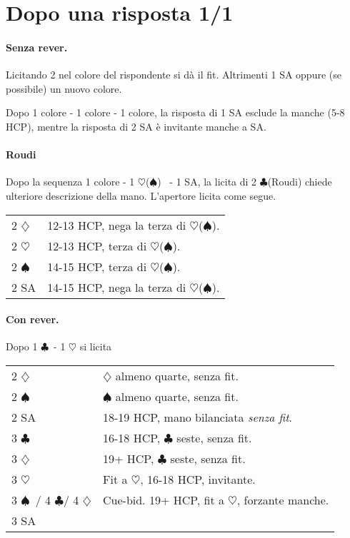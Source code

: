 \documentclass[a4paper,10pt]{article}
\renewcommand{\c}{$\clubsuit$\xspace}
\renewcommand{\d}{$\diamondsuit$\xspace}
\newcommand{\h}{$\heartsuit$\xspace}
\newcommand{\s}{$\spadesuit$\xspace}
\newcommand{\sa}{SA\xspace}
\newcommand{\smallspace}{\vskip0.3cm}
\newenvironment{twocol}
  {\smallspace\noindent\begin{tabular}{l p{0.78\textwidth}}}
  {\end{tabular}\smallspace}
\begin{document}
\pagebreak


\section{Dopo una risposta 1/1}

\paragraph{Senza rever.} Licitando 2 nel colore del rispondente si dà il fit. Altrimenti 1 \sa oppure (se possibile) un nuovo colore.

Dopo 1 colore - 1 colore - 1 colore, la risposta di 1 \sa esclude la manche (5-8 HCP), mentre la risposta di 2 \sa è invitante manche a \sa.

\paragraph{Roudi} Dopo la sequenza 1 colore - 1 \h (\s) \ - 1 \sa, la licita di 2 \c (Roudi) chiede ulteriore descrizione della mano. L'apertore licita come segue.
\begin{twocol}
	2 \d & 12-13 HCP, nega la terza di \h (\s).\\
	2 \h & 12-13 HCP, terza di \h (\s).\\
	2 \s & 14-15 HCP, terza di \h (\s).\\
	2 \sa & 14-15 HCP, nega la terza di \h (\s).
\end{twocol}


\paragraph{Con rever.} Dopo 1 \c\ - 1 \h si licita
\begin{twocol}
	2 \d & \d almeno quarte, senza fit.\\
	2 \s & \s almeno quarte, senza fit.\\
	2 \sa & 18-19 HCP, mano bilanciata \emph{senza fit}.\\
	3 \c & 16-18 HCP, \c seste, senza fit.\\
	3 \d & 19+ HCP, \c seste, senza fit.\\
	3 \h & Fit a \h, 16-18 HCP, invitante.\\
	3 \s\ / 4 \c / 4 \d & Cue-bid. 19+ HCP, fit a \h, forzante manche.\\
	3 \sa & 
\end{twocol}
\end{document}
